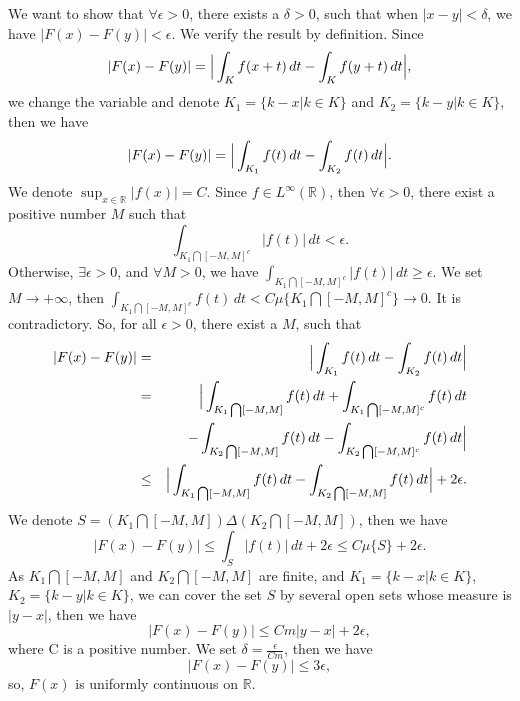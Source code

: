 \documentclass[12pt,a4paper]{ctexart}
\begin{document}
We want to show that $\forall \epsilon > 0$, there exists a $\delta > 0$, such that when $|x - y| < \delta$, we have $|F(x) - F(y)| < \epsilon$. We verify the result by definition. Since
\begin{equation*}
   |F(x) - F(y)|  =  \Big{|} \int_{K}^{} f(x + t) \, d t - \int_{K}^{} f(y + t) \, d t \Big{|},
\end{equation*}
we change the variable and denote $K_{1} = \{k - x| k \in K \}$ and $K_{2} = \{ k - y| k \in K \}$, then we have
\begin{equation*}
   |F(x) - F(y)|  =  \Big{|} \int_{K_{1}}^{} f(t) \, d t - \int_{K_{2}}^{} f(t) \, d t \Big{|}.
\end{equation*}
We denote $\sup_{x \in \mathbb{R}} |f(x)| = C$. Since $f \in L^{\infty} (\mathbb{R})$, then $\forall \epsilon > 0$, there exist a positive number $M$ such that
\begin{equation*}
    \int_{K_{1} \bigcap [-M, M]^{c}}^{} |f(t)| \, d t < \epsilon.
\end{equation*}
Otherwise, $\exists \epsilon > 0$, and $\forall M > 0$, we have $\int_{K_{1} \bigcap [-M, M]^{c}}^{} |f(t)| \, d t \geq \epsilon$. We set $M \to + \infty$, then $\int_{K_{1} \bigcap [-M, M]^{c}}^{} f(t) \, d t  < C \mu \{K_{1} \bigcap [-M, M]^{c} \} \to 0$. It is contradictory. So, for all $\epsilon > 0$, there exist a $M$, such that
\begin{eqnarray*}
|F(x) - F(y)| & = & \Big{|} \int_{K_{1}}^{} f(t) \, d t - \int_{K_{2}}^{} f(t) \, d t \Big{|} \\
& = & \Big{|} \int_{K_{1} \bigcap [-M, M]}^{} f(t) \, d t  + \int_{K_{1} \bigcap [-M, M]^{c}}^{} f(t) \, d t  \\
& & - \int_{K_{2} \bigcap [-M, M]}^{} f(t) \, d t - \int_{K_{2} \bigcap [-M, M]^{c}}^{} f(t) \, d t \Big{|}   \\
&\leq&  \Big{|} \int_{K_{1} \bigcap [-M, M]}^{} f(t) \, d t - \int_{K_{2} \bigcap [-M, M]}^{} f(t) \, d t \Big{|} + 2 \epsilon.
\end{eqnarray*}
We denote $S = (K_{1} \bigcap [-M, M]) \Delta (K_{2} \bigcap [-M, M])$, then we have
\begin{equation*}
    |F(x) - F(y)|  \leq  \int_{S}^{} |f(t)| \, d t + 2 \epsilon \leq C \mu \{S \} + 2 \epsilon.
\end{equation*}
As $K_{1} \bigcap [-M, M]$ and $K_{2} \bigcap [-M, M]$ are finite, and $K_{1} = \{k - x| k \in K \}$, $K_{2} = \{ k - y| k \in K \}$, we can cover the set $S$ by several open sets whose measure is $|y -x|$, then we have
\begin{equation*}
    |F(x) - F(y)| \leq C m |y - x| + 2 \epsilon,
\end{equation*}
where C is a positive number. We set $\delta = \frac{\epsilon}{Cm}$, then we have
\begin{equation*}
    |F(x) - F(y)| \leq  3 \epsilon,
\end{equation*}
so, $F(x)$ is uniformly continuous on $\mathbb{R}$.
\end{document}
